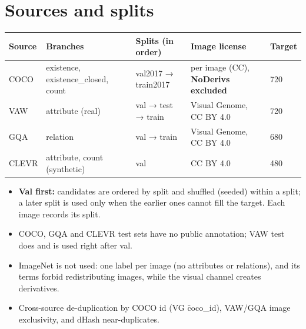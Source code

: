 \documentclass[10.5pt]{article}
\begin{document}
\section{Sources and splits}
\begin{longtable}{p{1.6cm}p{3.4cm}p{3.4cm}p{3.6cm}p{2.0cm}}
\toprule
\textbf{Source} & \textbf{Branches} & \textbf{Splits (in order)} & \textbf{Image license} & \textbf{Target}\\
\midrule
COCO & existence, existence\_\allowbreak closed, count & val2017 → train2017 & per image (CC), \textbf{NoDerivs
  excluded} & 720\\
VAW & attribute (real) & val → test → train & Visual Genome, CC BY 4.0 & 720\\
GQA & relation & val → train & Visual Genome, CC BY 4.0 & 680\\
CLEVR & attribute, count (synthetic) & val & CC BY 4.0 & 480\\
\bottomrule
\end{longtable}
\begin{itemize}
\item \textbf{Val first:} candidates are ordered by split and shuffled (seeded) within a split; a later split is
  used only when the earlier ones cannot fill the target. Each image records its split.
\item COCO, GQA and CLEVR test sets have no public annotation; VAW test does and is used right after val.
\item ImageNet is not used: one label per image (no attributes or relations), and its terms forbid redistributing
  images, while the visual channel creates derivatives.
\item Cross-source de-duplication by COCO id (VG \f{coco\_id}), VAW/GQA image exclusivity, and dHash near-duplicates.
\end{itemize}
\end{document}
